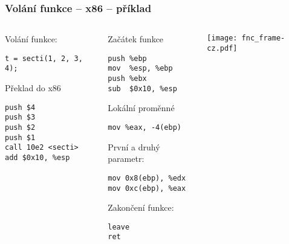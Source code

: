 \documentclass{beamer}
\begin{document}
\begin{frame}[fragile]
\frametitle{Volání funkce -- x86 -- příklad}

\begin{columns}
\begin{column}{0.35\textwidth}
Volání funkce:

\begin{verbatim}
t = secti(1, 2, 3, 4);
\end{verbatim}

Překlad do x86
\begin{verbatim}
push $4
push $3
push $2
push $1
call 10e2 <secti>
add $0x10, %esp
\end{verbatim}
\end{column}


\begin{column}{0.35\textwidth}  
Začátek funkce
\begin{verbatim}
push %ebp
mov  %esp, %ebp
push %ebx
sub  $0x10, %esp
\end{verbatim}

Lokální proměnné
\begin{verbatim}
mov %eax, -4(ebp)
\end{verbatim}

První a druhý parametr:
\begin{verbatim}
mov 0x8(ebp), %edx
mov 0xc(ebp), %eax
\end{verbatim}

Zakončení funkce:
\begin{verbatim}
leave
ret
\end{verbatim}
\end{column}

\begin{column}{0.3\textwidth}  
\texttt{[image: fnc\_frame-cz.pdf]}
\end{column}

\end{columns}
\end{frame}
\end{document}
